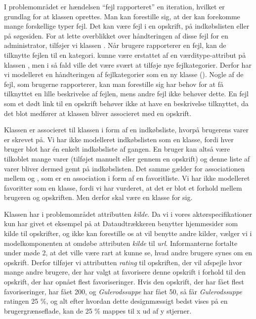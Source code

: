 I problemområdet er hændelsen ``fejl rapporteret'' en iteration, hvilket er grundlag for at klassen  oprettes. Man kan forestille sig, at der kan forekomme mange forskellige typer fejl. Det kan være fejl i en opskrift, på indkøbslisten eller på søgesiden. For at lette overblikket over håndteringen af disse fejl for en administrator, tilføjer vi klassen . Når brugere rapporterer en fejl, kan de tilknytte fejlen til en kategori.  kunne være erstattet af en værditype-attribut på klassen , men i så fald ville det være svært at tilføje nye fejlkategorier. Derfor har vi modelleret en håndteringen af fejlkategorier som en ny klasse (). Nogle af de fejl, som brugerne rapporterer, kan man forestille sig har behov for at få tilknyttet en lille beskrivelse af fejlen, mens andre fejl ikke behøver dette. En fejl som \fx et dødt link til en opskrift behøver ikke at have en beskrivelse tilknyttet, da det blot medfører at klassen  bliver associeret med en opskrift.

Klassen  er associeret til klassen  i form af en indkøbsliste, hvorpå brugerens varer er skrevet på. Vi har ikke modelleret indkøbslisten som en klasse, fordi hver bruger blot har én enkelt indkøbsliste af gangen. En bruger kan altså være tilkoblet mange varer (tilføjet manuelt eller gennem en opskrift) og denne liste af varer bliver dermed gemt på indkøbslisten. Det samme gælder for associationen mellem  og , som er en association i form af en favoritliste. Vi har ikke modelleret favoritter som en klasse, fordi vi har vurderet, at det er blot et forhold mellem brugeren og opskriften. Men derfor skal  være en klasse for sig.

Klassen  har i problemområdet attributten \textit{kilde}. Da vi i vores aktørspecifikationer kun har givet et eksempel på at Dataudtrækkeren benytter hjemmesider som kilde til opskrifter, og ikke kan forestille os at \Foodl{} vil benytte andre kilder, vælger vi i modelkomponenten at omdøbe attributen \textit{kilde} til \textit{url}. Informanterne fortalte under møde 2, at det ville være rart at kunne se, hvad andre brugere synes om en opskrift. Derfor tilføjer vi attributten \textit{rating} til opskriften, der vil afspejle hvor mange andre brugere, der har valgt at favorisere denne opskrift i forhold til den opskrift, der har opnået flest favoriseringer. Hvis den opskrift, der har fået flest favoriseringer, har fået 200, og \textit{Gulerodssuppe} har fået 50, så får \textit{Gulerodssuppe} ratingen 25 \%, og alt efter hvordan dette designmæssigt bedst vises på en brugergrænseflade, kan de 25 \% mappes til \fx x ud af y stjerner.

